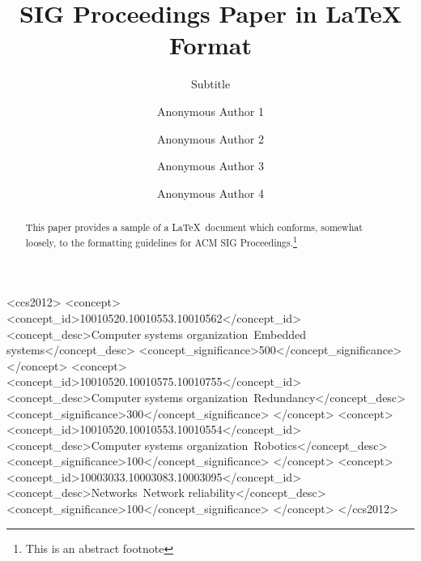 \documentclass[sigconf]{acmart}
\begin{document}
\title{SIG Proceedings Paper in LaTeX Format}
\subtitle{Subtitle}

  \author{Anonymous Author 1}
  
  \author{Anonymous Author 2}

  \author{Anonymous Author 3}

  \author{Anonymous Author 4}
  
  \renewcommand{\shortauthors}{A. Author et al.}


\begin{abstract}
This paper provides a sample of a \LaTeX\ document which conforms,
somewhat loosely, to the formatting guidelines for
ACM SIG Proceedings.\footnote{This is an abstract footnote}
\end{abstract}

%
%
\begin{CCSXML}
<ccs2012>
 <concept>
  <concept_id>10010520.10010553.10010562</concept_id>
  <concept_desc>Computer systems organization~Embedded systems</concept_desc>
  <concept_significance>500</concept_significance>
 </concept>
 <concept>
  <concept_id>10010520.10010575.10010755</concept_id>
  <concept_desc>Computer systems organization~Redundancy</concept_desc>
  <concept_significance>300</concept_significance>
 </concept>
 <concept>
  <concept_id>10010520.10010553.10010554</concept_id>
  <concept_desc>Computer systems organization~Robotics</concept_desc>
  <concept_significance>100</concept_significance>
 </concept>
 <concept>
  <concept_id>10003033.10003083.10003095</concept_id>
  <concept_desc>Networks~Network reliability</concept_desc>
  <concept_significance>100</concept_significance>
 </concept>
</ccs2012>  
\end{CCSXML}
\end{document}
